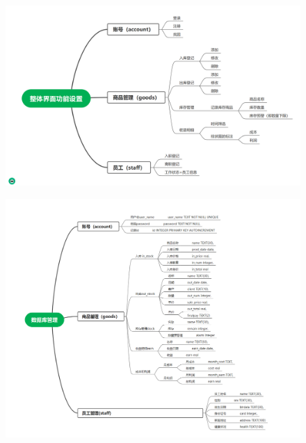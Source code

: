 \documentclass{article}
\begin{document}
\begin{figure}[H]
        \centering
        \includegraphics[scale=0.6]{1.png}
        \label{fig:enter-label}
\end{figure}
\begin{figure}[H]
        \centering
        \includegraphics[scale=0.6]{2.png}
        \label{fig:enter-label}
\end{figure}
\end{document}
